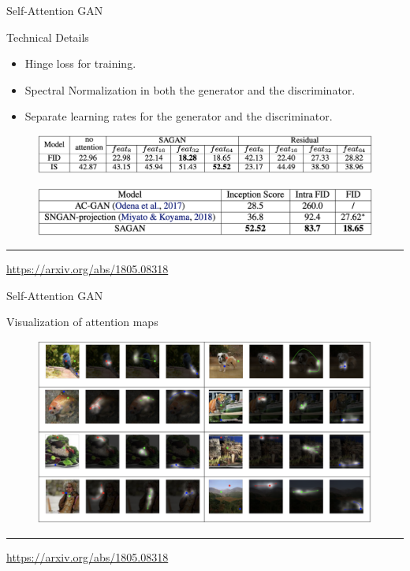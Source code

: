 \documentclass{beamer}
\begin{document}
\begin{frame}{Self-Attention GAN}
	\begin{block}{Technical Details}
		\begin{itemize}
			\item Hinge loss for training.
			\item Spectral Normalization in both the generator and the discriminator.
			\item Separate learning rates for the generator and the discriminator.
		\end{itemize}
	\end{block}
	\begin{figure}
		\centering
		\includegraphics[width=\linewidth]{figs/sa_results1}
	\end{figure}
	\begin{figure}
		\centering
		\includegraphics[width=\linewidth]{figs/sa_results2}
	\end{figure}
	\vfill
	\hrule\medskip 
	{\scriptsize \href{https://arxiv.org/abs/1805.08318}{https://arxiv.org/abs/1805.08318}}
\end{frame}
\begin{frame}{Self-Attention GAN}
	\begin{block}{Visualization of attention maps}
		\begin{figure}
			\centering
			\includegraphics[width=\linewidth]{figs/sa_maps}
		\end{figure}
	\end{block}
	\vfill
	\hrule\medskip 
	{\scriptsize \href{https://arxiv.org/abs/1805.08318}{https://arxiv.org/abs/1805.08318}}
\end{frame}
\end{document}
